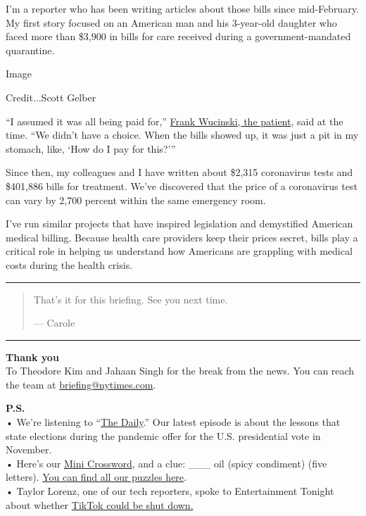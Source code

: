 I'm a reporter who has been writing articles about those bills since
mid-February. My first story focused on an American man and his
3-year-old daughter who faced more than \$3,900 in bills for care
received during a government-mandated quarantine.

Image

Credit...Scott Gelber

``I assumed it was all being paid for,''
\href{https://www.nytimes.com/2020/02/29/upshot/coronavirus-surprise-medical-bills.html}{Frank
Wucinski, the patient}, said at the time. ``We didn't have a choice.
When the bills showed up, it was just a pit in my stomach, like, `How do
I pay for this?'''

Since then, my colleagues and I have written about \$2,315 coronavirus
tests and \$401,886 bills for treatment. We've discovered that the price
of a coronavirus test can vary by 2,700 percent within the same
emergency room.

I've run similar projects that have inspired legislation and demystified
American medical billing. Because health care providers keep their
prices secret, bills play a critical role in helping us understand how
Americans are grappling with medical costs during the health crisis.

\begin{center}\rule{0.5\linewidth}{\linethickness}\end{center}

\begin{quote}
That's it for this briefing. See you next time.

--- Carole
\end{quote}

\begin{center}\rule{0.5\linewidth}{\linethickness}\end{center}

\textbf{Thank you}\\
To Theodore Kim and Jahaan Singh for the break from the news. You can
reach the team at
\href{mailto:briefing+pm@nytimes.com?subject=Briefing\%20Feedback}{briefing@nytimes.com}.

\textbf{P.S.}\\
• We're listening to ``\href{https://www.nytimes.com/thedaily}{The
Daily}.'' Our latest episode is about the lessons that state elections
during the pandemic offer for the U.S. presidential vote in November.\\
• Here's our \href{https://www.nytimes.com/crosswords/game/mini}{Mini
Crossword}, and a clue: \_\_\_ oil (spicy condiment) (five letters).
\href{https://www.nytimes.com/crosswords}{You can find all our puzzles
here}.\\
• Taylor Lorenz, one of our tech reporters, spoke to Entertainment
Tonight about whether
\href{https://www.etonline.com/could-tiktok-really-get-shut-down-heres-what-you-need-to-know-150710}{TikTok
could be shut down.}


